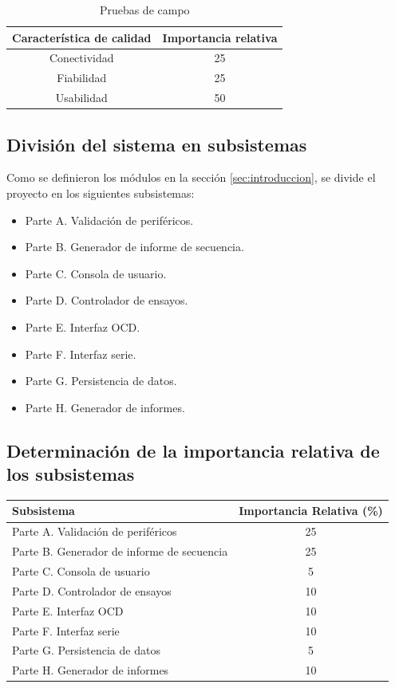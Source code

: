 \documentclass[
    11pt,
    spanish,
	a4paper
]{article}
\begin{document}
\begin{table}[H]
\centering
\caption{Pruebas de campo}
\begin{tabular}{c|c}
    Característica de calidad & Importancia relativa \\ \hline
    Conectividad & 25 \\
    Fiabilidad   & 25 \\
    Usabilidad   & 50 \\
\end{tabular}
\end{table}

\subsection{División del sistema en subsistemas}
\label{sub:division}

Como se definieron los módulos en la sección \ref{sec:introduccion}, se divide el proyecto en los siguientes subsistemas:

\begin{itemize}
    \item Parte A. Validación de periféricos.
    \item Parte B. Generador de informe de secuencia.
    \item Parte C. Consola de usuario.
    \item Parte D. Controlador de ensayos.
    \item Parte E. Interfaz OCD.
    \item Parte F. Interfaz serie.
    \item Parte G. Persistencia de datos.
    \item Parte H. Generador de informes.
\end{itemize}

\subsection{Determinación de la importancia relativa de los subsistemas}
\label{sub:determinacion}

\begin{table}[H]
\centering
\begin{tabular}{l|c}
    Subsistema & Importancia Relativa (\%) \\ \hline
    Parte A. Validación de periféricos         & 25 \\
    Parte B. Generador de informe de secuencia & 25 \\
    Parte C. Consola de usuario                &  5 \\
    Parte D. Controlador de ensayos            & 10 \\
    Parte E. Interfaz OCD                      & 10 \\
    Parte F. Interfaz serie                    & 10 \\
    Parte G. Persistencia de datos             &  5 \\
    Parte H. Generador de informes             & 10 \\
\end{tabular}
\end{table}
\end{document}
